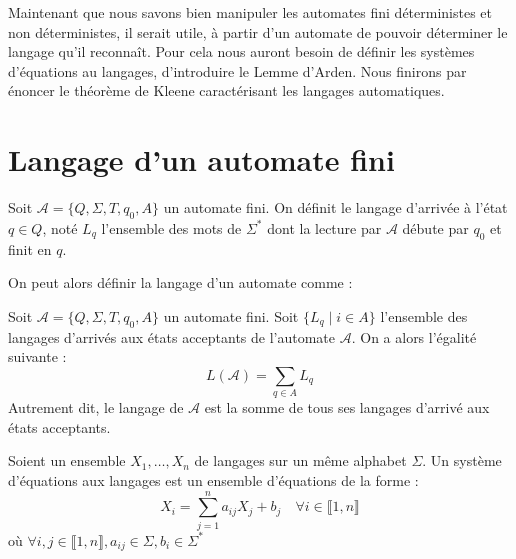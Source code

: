 

\minitoc %



Maintenant que nous savons bien manipuler les automates fini déterministes et non déterministes, il serait utile, 
à partir d'un automate de pouvoir déterminer le langage qu'il reconnaît. Pour cela nous auront besoin de définir 
les systèmes d'équations au langages, d'introduire le Lemme d'Arden. Nous finirons par énoncer le théorème de Kleene 
caractérisant les langages automatiques. 


\section{Langage d'un automate fini}

\begin{definition}
    Soit $ \mathcal{A} = \{Q, \Sigma, T, q_0, A\}$ un automate fini. On définit le langage d'arrivée à l'état $ q \in Q$, 
    noté $ L_q$ l'ensemble des mots de $ \Sigma^*$ dont la lecture par $ \mathcal{A}$ débute par $q_0$ et finit en $q$. 
\end{definition}

On peut alors définir la langage d'un automate comme :

\begin{proposition}
    Soit $ \mathcal{A} = \{Q, \Sigma, T, q_0, A\}$ un automate fini. Soit $\{L_q \; | \; i \in A \}$ 
    l'ensemble des langages d'arrivés aux états acceptants de l'automate $ \mathcal{A}$. On a alors l'égalité suivante : 
        \[ L( \mathcal{A}) = \sum_{q \in A} L_q \]
    Autrement dit, le langage de $ \mathcal{A}$ est la somme de tous ses langages d'arrivé aux états acceptants. 
\end{proposition}

\begin{definition}
    Soient un ensemble $X_1, \dots, X_n$ de langages sur un même alphabet $\Sigma$. 
    Un système d'équations aux langages est un ensemble d'équations de la forme : 
        \[ X_i = \sum_{j=1}^{n} a_{ij} X_j + b_j \quad \forall i \in \llbracket 1, n \rrbracket \] 
    où $ \forall i,j \in \llbracket 1, n \rrbracket, a_{ij} \in \Sigma, b_i \in \Sigma^*$
\end{definition}

